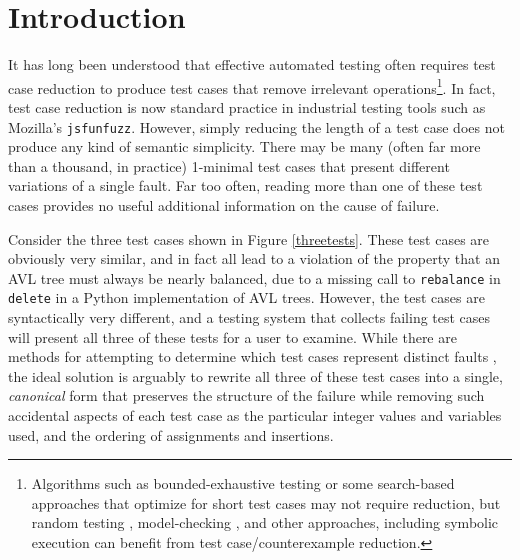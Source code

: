 \section{Introduction}

It has long been understood that effective automated testing often requires
test case reduction \cite{DD,MinUnit,TCminim,ICSEDiff} to produce test cases
that remove irrelevant operations\footnote{Algorithms such as
  bounded-exhaustive testing \cite{SoftBET} or some search-based approaches that
  optimize for short test cases \cite{FA11} may not require reduction, but random
  testing \cite{RandFormal,HamletOnly}, model-checking \cite{Gastin04minimizationof}, and other
  approaches, including symbolic execution \cite{issta14} can benefit from
  test case/counterexample reduction.}.  In fact, test case reduction is
now standard practice in industrial testing tools such as Mozilla's
{\tt jsfunfuzz}.  However, simply reducing the length of a test case
does not produce any kind of semantic simplicity.  There may be many
(often far more than a thousand, in practice) 1-minimal test cases
that present different variations of a single fault.  Far too often,
reading more than one of these test cases provides no useful
additional information on the cause of failure.

Consider the three test cases shown in Figure \ref{threetests}.  These
test cases are obviously very similar, and in fact all lead to a
violation of the property that an AVL tree must always be nearly
balanced, due to a missing call to {\tt rebalance} in {\tt delete} in
a Python implementation of AVL trees.  However, the test cases are
syntactically very different, and a testing system that collects
failing test cases will present all three of these tests for a user to examine.
While there are methods for attempting to determine which test cases
represent distinct faults \cite{PLDI13}, the ideal solution is
arguably to rewrite all three of these test cases into a single,
\emph{canonical} form that preserves the structure of the failure while removing
such accidental aspects of each test case as the particular integer
values and variables used, and the ordering of assignments and
insertions.

